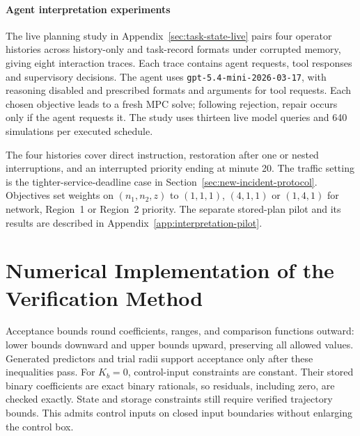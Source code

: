 \documentclass[final]{cas-sc}
\theoremstyle{definition}
\theoremstyle{plain}
\theoremstyle{definition}
\theoremstyle{plain}
\newcommand{\appref}[1]{Appendix~\ref{#1}}
\begin{document}
\paragraph{Agent interpretation experiments}
\label{app:agent-evaluation}
\label{sec:supp-execution}
\label{sec:queue-live-pilot}
\label{sec:primary-memory-pressure}
The live planning study in \appref{sec:task-state-live} pairs four
operator histories across history-only and task-record formats under
corrupted memory, giving eight interaction traces. Each trace contains
agent requests, tool responses and supervisory decisions. The agent uses
\texttt{gpt-5.4-mini-2026-03-17}, with reasoning disabled and prescribed
formats and arguments for tool requests. Each chosen objective leads to
a fresh MPC solve; following rejection, repair occurs only if the agent
requests it. The study uses thirteen live model queries and 640
simulations per executed schedule.

The four histories cover direct instruction, restoration after one or
nested interruptions, and an interrupted priority ending at minute 20.
The traffic setting is the tighter-service-deadline case in
Section~\ref{sec:new-incident-protocol}. Objectives set weights on
$(n_1,n_2,z)$ to $(1,1,1)$, $(4,1,1)$ or $(1,4,1)$ for network,
Region~1 or Region~2 priority. The separate stored-plan pilot and its
results are described in \appref{app:interpretation-pilot}.



\section{Numerical Implementation of the Verification Method}
\label{app:verified-arithmetic}

Acceptance bounds round coefficients, ranges, and comparison functions
outward: lower bounds downward and upper bounds upward, preserving all
allowed values. Generated predictors and trial radii support acceptance
only after these inequalities pass. For $K_b=0$, control-input constraints
are constant. Their stored binary coefficients are exact binary rationals,
so residuals, including zero, are checked exactly. State and storage
constraints still require verified trajectory bounds. This admits control inputs
on closed input boundaries without enlarging the control box.
\end{document}

